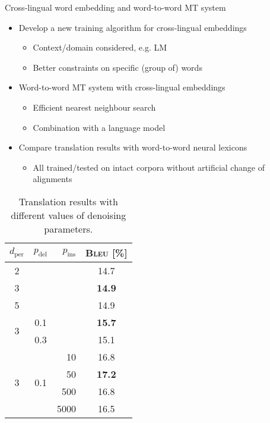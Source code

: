 \documentclass[11pt, a4paper, landscape]{article}
\begin{document}
	\NewPage
	\vfill
	Cross-lingual word embedding and word-to-word MT system
	\begin{itemize}
		\item Develop a new training algorithm for cross-lingual embeddings
		\begin{itemize}
			\item Context/domain considered, e.g. LM
			\item Better constraints on specific (group of) words\\
		\end{itemize}
		\item Word-to-word MT system with cross-lingual embeddings
		\begin{itemize}
			\item Efficient nearest neighbour search
			\item Combination with a language model\\
		\end{itemize}
		\item Compare translation results with word-to-word neural lexicons
		\begin{itemize}
			\item  All trained/tested on intact corpora without artificial change of alignments
			
		\end{itemize}
	\end{itemize}
	\vfill
	\NewPage
	\vfill
	\begin{table}[!ht]
		\centering
		\begin{tabular}{ccrc}
			\toprule
			$d_\text{per}$ & $p_\text{del}$ & $p_\text{ins}$ & \textsc{Bleu} [\%] \\
			\midrule
			2 & & & 14.7\\
			3 & & & \textbf{14.9}\\
			5 & & & 14.9\\
			\midrule
			\multirow{2}{*}{3} & 0.1 & & \textbf{15.7} \\
			& 0.3 & & 15.1 \\
			\midrule
			\multirow{6}{*}{3} & \multirow{6}{*}{0.1} & 10 & 16.8 \\
			& & 50 & \textbf{17.2} \\
			& & 500 & 16.8 \\
			& & 5000 & 16.5\\
			\bottomrule
		\end{tabular}
		\caption{Translation results with different values of denoising parameters.}
		\setcounter{table}{1}
		\label{tab:denoising}
	\end{table}
	\vfill
	
\end{document}
